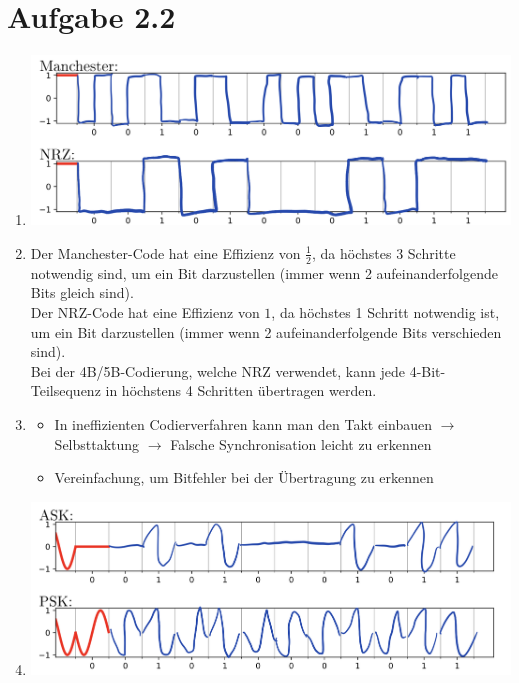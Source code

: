 \documentclass[12pt, a4paper]{article}
\begin{document}
\section*{Aufgabe 2.2}
\begin{enumerate}[label=\alph*)]
	\item	\includegraphics[scale=0.5]{2.1_a.png}
	\item	Der Manchester-Code hat eine Effizienz von $\frac{1}{2}$, da höchstes 3 Schritte notwendig sind, um ein Bit darzustellen (immer wenn 2 aufeinanderfolgende Bits gleich sind).\\
			Der NRZ-Code hat eine Effizienz von $1$, da höchstes 1 Schritt notwendig ist, um ein Bit darzustellen (immer wenn 2 aufeinanderfolgende Bits verschieden sind).\\
			
			Bei der 4B/5B-Codierung, welche NRZ verwendet, kann jede 4-Bit-Teilsequenz in höchstens 4 Schritten übertragen werden.
	\item	\begin{itemize}
				\item	In ineffizienten Codierverfahren kann man den Takt einbauen $\rightarrow$ Selbsttaktung $\rightarrow$ Falsche Synchronisation leicht zu erkennen
				\item	Vereinfachung, um Bitfehler bei der Übertragung zu erkennen
			\end{itemize}
	\item	\includegraphics[scale=0.5]{2.1_d.png}
\end{enumerate}


\newpage
\end{document}
